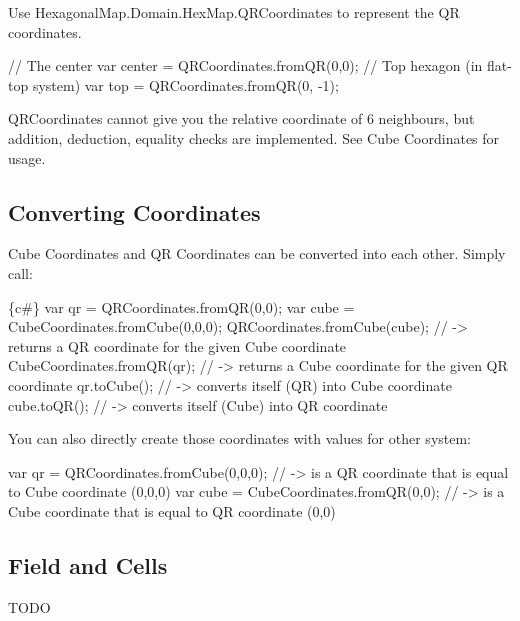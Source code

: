 Use {\ttfamily Hexagonal\+Map.\+Domain.\+Hex\+Map.\+Q\+R\+Coordinates} to represent the QR coordinates. ~\newline
 
\begin{DoxyCode}
// The center
var center = QRCoordinates.fromQR(0,0);
// Top hexagon (in flat-top system)
var top = QRCoordinates.fromQR(0, -1);
\end{DoxyCode}


{\ttfamily Q\+R\+Coordinates} cannot give you the relative coordinate of 6 neighbours, but addition, deduction, equality checks are implemented. See Cube Coordinates for usage.

\subsection*{Converting Coordinates}

Cube Coordinates and QR Coordinates can be converted into each other. Simply call\+:


\begin{DoxyCode}
\{c#\}
var qr = QRCoordinates.fromQR(0,0);
var cube = CubeCoordinates.fromCube(0,0,0);
QRCoordinates.fromCube(cube); // -> returns a QR coordinate for the given Cube coordinate
CubeCoordinates.fromQR(qr); // -> returns a Cube coordinate for the given QR coordinate
qr.toCube(); // -> converts itself (QR) into Cube coordinate
cube.toQR(); // -> converts itself (Cube) into QR coordinate
\end{DoxyCode}


You can also directly create those coordinates with values for other system\+:


\begin{DoxyCode}
var qr = QRCoordinates.fromCube(0,0,0); // -> is a QR coordinate that is equal to Cube coordinate (0,0,0)
var cube = CubeCoordinates.fromQR(0,0); // -> is a Cube coordinate that is equal to QR coordinate (0,0)
\end{DoxyCode}


\subsection*{Field and Cells}

T\+O\+DO 